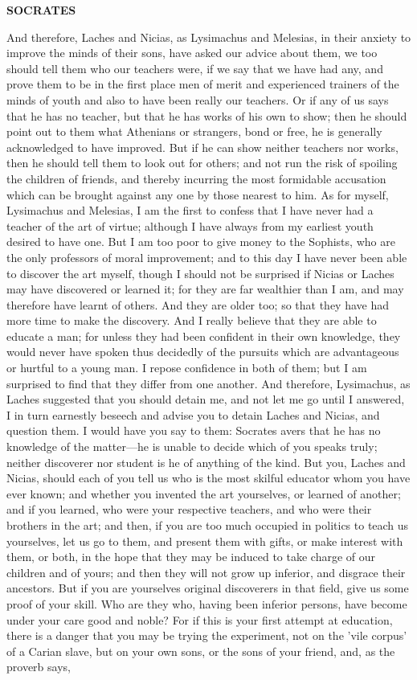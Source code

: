 \documentclass[11pt,letter]{article}
\begin{document}
\par \textbf{SOCRATES}
\par   And therefore, Laches and Nicias, as Lysimachus and Melesias, in their anxiety to improve the minds of their sons, have asked our advice about them, we too should tell them who our teachers were, if we say that we have had any, and prove them to be in the first place men of merit and experienced trainers of the minds of youth and also to have been really our teachers. Or if any of us says that he has no teacher, but that he has works of his own to show; then he should point out to them what Athenians or strangers, bond or free, he is generally acknowledged to have improved. But if he can show neither teachers nor works, then he should tell them to look out for others; and not run the risk of spoiling the children of friends, and thereby incurring the most formidable accusation which can be brought against any one by those nearest to him. As for myself, Lysimachus and Melesias, I am the first to confess that I have never had a teacher of the art of virtue; although I have always from my earliest youth desired to have one. But I am too poor to give money to the Sophists, who are the only professors of moral improvement; and to this day I have never been able to discover the art myself, though I should not be surprised if Nicias or Laches may have discovered or learned it; for they are far wealthier than I am, and may therefore have learnt of others. And they are older too; so that they have had more time to make the discovery. And I really believe that they are able to educate a man; for unless they had been confident in their own knowledge, they would never have spoken thus decidedly of the pursuits which are advantageous or hurtful to a young man. I repose confidence in both of them; but I am surprised to find that they differ from one another. And therefore, Lysimachus, as Laches suggested that you should detain me, and not let me go until I answered, I in turn earnestly beseech and advise you to detain Laches and Nicias, and question them. I would have you say to them:  Socrates avers that he has no knowledge of the matter—he is unable to decide which of you speaks truly; neither discoverer nor student is he of anything of the kind. But you, Laches and Nicias, should each of you tell us who is the most skilful educator whom you have ever known; and whether you invented the art yourselves, or learned of another; and if you learned, who were your respective teachers, and who were their brothers in the art; and then, if you are too much occupied in politics to teach us yourselves, let us go to them, and present them with gifts, or make interest with them, or both, in the hope that they may be induced to take charge of our children and of yours; and then they will not grow up inferior, and disgrace their ancestors. But if you are yourselves original discoverers in that field, give us some proof of your skill. Who are they who, having been inferior persons, have become under your care good and noble? For if this is your first attempt at education, there is a danger that you may be trying the experiment, not on the 'vile corpus' of a Carian slave, but on your own sons, or the sons of your friend, and, as the proverb says, 
\end{document}
